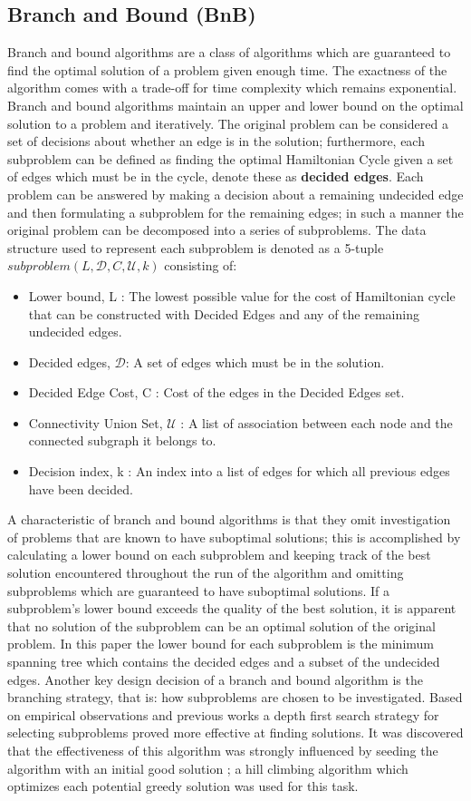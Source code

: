 \documentclass[format=sigconf]{acmart}
\begin{document}
\subsection{Branch and Bound (BnB)}
Branch and bound algorithms are a class of algorithms which are guaranteed to find the optimal solution of a problem given enough time. The exactness of the algorithm comes with a trade-off for time complexity which remains exponential. Branch and bound algorithms maintain an upper and lower bound on the optimal solution to a problem and iteratively. The original problem can be considered a set of decisions about whether an edge is in the solution; furthermore, each subproblem can be defined as finding the optimal Hamiltonian Cycle given a set of edges which must be in the cycle, denote these as \textbf{decided edges}. Each problem can be answered by making a decision about a remaining undecided edge and then formulating a subproblem for the remaining edges; in such a manner the original problem can be decomposed into a series of subproblems. The data structure used to represent each subproblem is denoted as a 5-tuple $subproblem(L,\mathcal{D}, C, \mathcal{U}, k)$ consisting of:
\begin{itemize}
	\item  Lower bound, L : The lowest possible value for the cost of Hamiltonian cycle that can be constructed with Decided Edges and any of the remaining undecided edges.
	\item  Decided edges, $\mathcal{D}$: A set of edges which must be in the solution.
	\item  Decided Edge Cost, C : Cost of the edges in the Decided Edges set.
	\item  Connectivity Union Set, $\mathcal{U}$ : A list of association between each node and the connected subgraph it belongs to.
	\item  Decision index, k : An index into a list of edges for which all previous edges have been decided.
\end{itemize}
 A characteristic of branch and bound algorithms is that they omit investigation of problems that are known to have suboptimal solutions; this is accomplished by calculating a lower bound on each subproblem and keeping track of the best solution encountered throughout the run of the algorithm and omitting subproblems which are guaranteed to have suboptimal solutions. If a subproblem's lower bound exceeds the quality of the best solution, it is apparent that no solution  of the subproblem can be an optimal solution of the original problem. In this paper the lower bound for each subproblem is the minimum spanning tree which contains the decided edges and a subset of the undecided edges. Another key design decision of a branch and bound algorithm is the branching strategy, that is: how subproblems are chosen to be investigated. Based on empirical observations and previous works \cite{bnb-principles} a depth first search strategy for selecting subproblems proved more effective at finding solutions. It was discovered that the effectiveness of this algorithm was strongly influenced by seeding the algorithm with an initial good solution \cite{bnb-principles}; a hill climbing algorithm which optimizes each potential greedy solution was used for this task.
\end{document}
